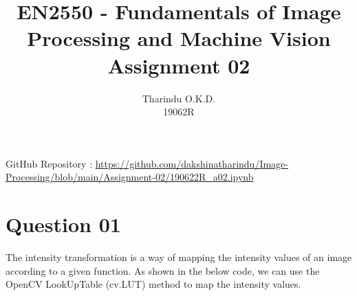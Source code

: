 \documentclass[a4paper]{article}
\title{\textbf{EN2550 - Fundamentals of Image Processing and Machine Vision}\\
Assignment 02}
\author{Tharindu O.K.D.\\19062R}
\begin{document}
\maketitle
GitHub Repository : \url{https://github.com/dakshinatharindu/Image-Processing/blob/main/Assignment-02/190622R_a02.ipynb}
\section*{Question 01}

The intensity transformation is a way of mapping the intensity values of
 an image according to a given function. As shown in the below code, we
  can use the OpenCV LookUpTable (cv.LUT) method to map the intensity values.
\end{document}
